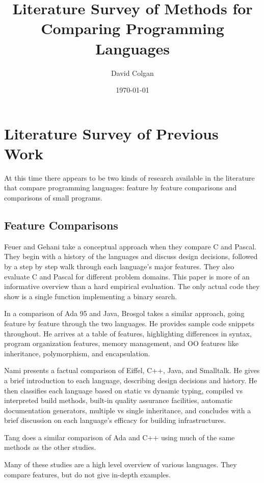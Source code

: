 \documentclass{article}
\title{Literature Survey of Methods for Comparing Programming Languages}
\author{David Colgan}
\date{\today}
\begin{document}
\maketitle


\section{Literature Survey of Previous Work}

At this time there appears to be two kinds of research available in the
literature that compare programming languages: feature by feature comparisons
and comparisons of small programs.

\subsection{Feature Comparisons}

Feuer and Gehani take a conceptual approach when they compare C and
Pascal.\cite{FeuerCVsPascal}  They begin with a history of the languages and
discuss design decisions, followed by a step by step walk through each
language's major features.  They also evaluate C and Pascal for different
problem domains.  This paper is more of an informative overview than a hard
empirical evaluation.  The only actual code they show is a single function
implementing a binary search.

In a comparison of Ada 95 and Java, Brosgol takes a similar
approach,\cite{BrosgolCompOOAdaVsJava} going feature by feature through the two
languages.  He provides sample code snippets throughout.  He arrives at a table
of features, highlighting differences in syntax, program organization features,
memory management, and OO features like inheritance, polymorphism, and
encapsulation.

Nami presents a factual comparison of Eiffel, C++, Java, and
Smalltalk\cite{NamiCompOOSoftEng}.  He gives a brief introduction to each
language, describing design decisions and history.  He then classifies each
language based on static vs dynamic typing, compiled vs interpreted build
methods, built-in quality assurance facilities, automatic documentation
generators, multiple vs single inheritance, and concludes with a brief
discussion on each language's efficacy for building infrastructures.

Tang does a similar comparison of Ada and C++ using much of the same methods as
the other studies.\cite{TangAdaVsCpp}

Many of these studies are a high level overview of various languages.  They
compare features, but do not give in-depth examples.
\end{document}
